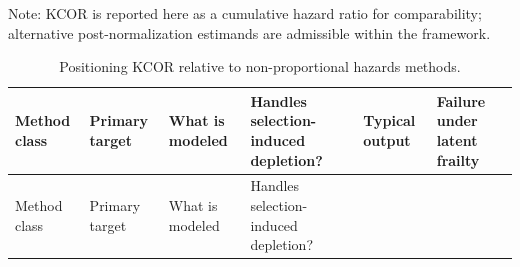 \documentclass[
]{article}
\begin{document}
Note: KCOR is reported here as a cumulative hazard ratio for
comparability; alternative post-normalization estimands are admissible
within the framework.

\newpage

\begin{longtable}[]{@{}
  >{\raggedright\arraybackslash}p{}
  >{\raggedright\arraybackslash}p{}
  >{\raggedright\arraybackslash}p{}
  >{\raggedright\arraybackslash}p{}
  >{\raggedright\arraybackslash}p{}
  >{\raggedright\arraybackslash}p{}@{}}
\caption{Positioning KCOR relative to non-proportional hazards
methods.}\label{tbl:positioning}\tabularnewline
\toprule\noalign{}
\begin{minipage}[b]{\linewidth}\raggedright
Method class
\end{minipage} & \begin{minipage}[b]{\linewidth}\raggedright
Primary target
\end{minipage} & \begin{minipage}[b]{\linewidth}\raggedright
What is modeled
\end{minipage} & \begin{minipage}[b]{\linewidth}\raggedright
Handles selection-induced depletion?
\end{minipage} & \begin{minipage}[b]{\linewidth}\raggedright
Typical output
\end{minipage} & \begin{minipage}[b]{\linewidth}\raggedright
Failure under latent frailty
\end{minipage} \\
\midrule\noalign{}
\endfirsthead
\toprule\noalign{}
\begin{minipage}[b]{\linewidth}\raggedright
Method class
\end{minipage} & \begin{minipage}[b]{\linewidth}\raggedright
Primary target
\end{minipage} & \begin{minipage}[b]{\linewidth}\raggedright
What is modeled
\end{minipage} & \begin{minipage}[b]{\linewidth}\raggedright
Handles selection-induced depletion?
\end{minipage} & \begin{minipage}[b]{\linewidth}\raggedright

\end{minipage}
\end{longtable}
\end{document}
